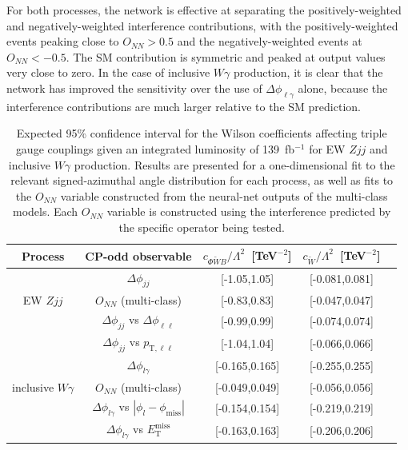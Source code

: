 \documentclass[twocolumn,preprintnumbers,superscriptaddress,nofootinbib,aps,prd,floatfix]{revtex4}
\begin{document}
For both processes, the network is effective at separating the positively-weighted and negatively-weighted interference contributions, with the positively-weighted events peaking close to $O_{NN}>0.5$ and the negatively-weighted events at $O_{NN}<-0.5$. The SM contribution is symmetric and peaked at output values very close to zero. In the case of inclusive $W\gamma$ production, it is clear that the network has improved the sensitivity over the use of $\Delta\phi_{\ell \gamma}$ alone, because the interference contributions are much larger relative to the SM prediction. 



\begin{table}[!t]
    \centering
    \begin{tabular}{|c|c|c|c|c|}
    \hline 
     Process & CP-odd observable & $c_{\Phi \widetilde{W}B} / \Lambda^2$~[TeV$^{-2}$] & $c_{ \widetilde{W}} / \Lambda^2$~[TeV$^{-2}$]\\
     \hline 
       & $\Delta\phi_{jj}$ & [-1.05,1.05] & [-0.081,0.081] \\
      EW $Zjj$  & $O_{NN}$ (multi-class)  & [-0.83,0.83] & [-0.047,0.047] \\
& $\Delta\phi_{jj}$ vs $\Delta\phi_{\ell\ell}$  & [-0.99,0.99] & [-0.074,0.074] \\
& $\Delta\phi_{jj}$ vs $p_{\textrm{T},\ell\ell}$  & [-1.04,1.04] & [-0.066,0.066] \\
    \hline   
    & $\Delta\phi_{l\gamma}$ & [-0.165,0.165] & [-0.255,0.255] \\
       inclusive $W\gamma$  &   $O_{NN}$ (multi-class)  & [-0.049,0.049] & [-0.056,0.056] \\
& $\Delta\phi_{l\gamma}$ vs $|\phi_{l} - \phi_\textrm{miss}|$  & [-0.154,0.154] & [-0.219,0.219] \\
& $\Delta\phi_{l\gamma}$ vs $E_\textrm{T}^\textrm{miss}$  & [-0.163,0.163] & [-0.206,0.206] \\
 \hline
 \end{tabular}
    \caption{Expected 95\% confidence interval for the Wilson coefficients affecting triple gauge couplings given an integrated luminosity of 139~fb$^{-1}$ for EW $Zjj$ and inclusive $W\gamma$ production. Results are presented for a one-dimensional fit to the relevant signed-azimuthal angle distribution for each process, as well as fits to the $O_{NN}$ variable constructed from the neural-net outputs of the multi-class models. Each $O_{NN}$ variable is constructed using the interference predicted by the specific operator being tested. 
    \label{tab:vbfz_wy}}
\end{table}
\end{document}
